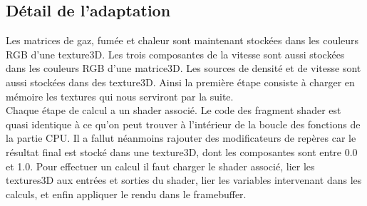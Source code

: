 \documentclass[a4paper,10pt]{article}
\begin{document}
\subsection{Détail de l'adaptation}
Les matrices de gaz, fumée et chaleur sont maintenant stockées dans les 
couleurs RGB d'une texture3D.
Les trois composantes de la vitesse sont aussi stockées dans les couleurs RGB 
d'une matrice3D.
Les sources de densité et de vitesse sont aussi stockées dans des texture3D.
Ainsi la première étape consiste à charger en mémoire les textures
qui nous serviront par la suite.\\

Chaque étape de calcul a un shader associé. Le code des fragment shader 
est quasi identique à ce qu'on peut trouver à l'intérieur de la boucle
des fonctions de la partie CPU. Il a fallut néanmoins rajouter des modificateurs
de repères car le résultat final est stocké dans une texture3D, dont les composantes
sont entre 0.0 et 1.0. Pour effectuer un calcul il faut charger le shader associé,
lier les textures3D aux entrées et sorties du shader, lier les variables intervenant
dans les calculs, et enfin appliquer le rendu dans le framebuffer.\\
\end{document}
